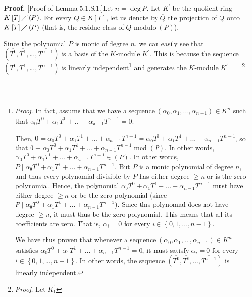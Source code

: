 \documentclass[numbers=enddot,12pt,final,onecolumn,notitlepage]{scrartcl}%
\newenvironment{proof}[1][Proof]{\noindent\textbf{#1.} }{\ \rule{0.5em}{0.5em}}
\begin{document}
\begin{proof}
[Proof of Lemma 5.1.S.1.]Let $n=\deg P$. Let $K^{\prime}$ be the quotient ring
$K\left[  T\right]  \diagup\left(  P\right)  $. For every $Q\in K\left[
T\right]  $, let us denote by $\overline{Q}$ the projection of $Q$ onto
$K\left[  T\right]  \diagup\left(  P\right)  $ (that is, the residue class of
$Q$ modulo $\left(  P\right)  $).

Since the polynomial $P$ is monic of degree $n$, we can easily see that
$\left(  \overline{T^{0}},\overline{T^{1}},...,\overline{T^{n-1}}\right)  $ is
a basis of the $K$-module $K^{\prime}$. This is because the sequence $\left(
\overline{T^{0}},\overline{T^{1}},...,\overline{T^{n-1}}\right)  $ is linearly
independent\footnote{\textit{Proof.} In fact, assume that we have a sequence
$\left(  \alpha_{0},\alpha_{1},...,\alpha_{n-1}\right)  \in K^{n}$ such that
$\alpha_{0}\overline{T^{0}}+\alpha_{1}\overline{T^{1}}+...+\alpha
_{n-1}\overline{T^{n-1}}=0$.
\par
Then, $0=\alpha_{0}\overline{T^{0}}+\alpha_{1}\overline{T^{1}}+...+\alpha
_{n-1}\overline{T^{n-1}}=\overline{\alpha_{0}T^{0}+\alpha_{1}T^{1}%
+...+\alpha_{n-1}T^{n-1}}$, so that $0\equiv\alpha_{0}T^{0}+\alpha_{1}%
T^{1}+...+\alpha_{n-1}T^{n-1}\operatorname{mod}\left(  P\right)  $. In other
words, $\alpha_{0}T^{0}+\alpha_{1}T^{1}+...+\alpha_{n-1}T^{n-1}\in\left(
P\right)  $. In other words, $P\mid\alpha_{0}T^{0}+\alpha_{1}T^{1}%
+...+\alpha_{n-1}T^{n-1}$. But $P$ is a monic polynomial of degree $n$, and
thus every polynomial divisible by $P$ has either degree $\geq n$ or is the
zero polynomial. Hence, the polynomial $\alpha_{0}T^{0}+\alpha_{1}%
T^{1}+...+\alpha_{n-1}T^{n-1}$ must have either degree $\geq n$ or be the zero
polynomial (since $P\mid\alpha_{0}T^{0}+\alpha_{1}T^{1}+...+\alpha
_{n-1}T^{n-1}$). Since this polynomial does not have degree $\geq n$, it must
thus be the zero polynomial. This means that all its coefficients are zero.
That is, $\alpha_{i}=0$ for every $i\in\left\{  0,1,...,n-1\right\}  $.
\par
We have thus proven that whenever a sequence $\left(  \alpha_{0},\alpha
_{1},...,\alpha_{n-1}\right)  \in K^{n}$ satisfies $\alpha_{0}\overline{T^{0}%
}+\alpha_{1}\overline{T^{1}}+...+\alpha_{n-1}\overline{T^{n-1}}=0$, it must
satisfy $\alpha_{i}=0$ for every $i\in\left\{  0,1,...,n-1\right\}  $. In
other words, the sequence $\left(  \overline{T^{0}},\overline{T^{1}%
},...,\overline{T^{n-1}}\right)  $ is linearly independent.} and generates the
$K$-module $K^{\prime}$\ \ \ \ \footnote{\textit{Proof.} Let $K_{1}^{\prime}$
}
\end{proof}
\end{document}
